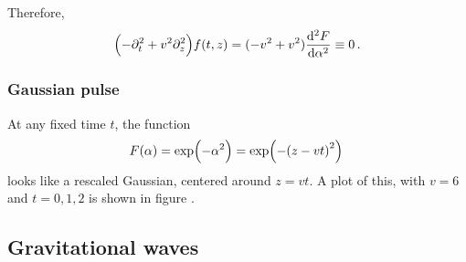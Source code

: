\documentclass[main.tex]{subfiles}
\begin{document}
Therefore, 
%
\begin{align}
\qty(-\partial_{t}^2 + v^2 \partial_{z}^2) f(t, z) 
= (-v^2 + v^2) \dv[2]{F}{\alpha } \equiv 0 
\,.
\end{align}

\subsubsection{Gaussian pulse}

At any fixed time \(t\), the function 
%
\begin{align}
F(\alpha ) = \exp(- \alpha^2) = \exp(- \qty(z - v t)^2)
\,
\end{align}
%
looks like a rescaled Gaussian, centered around \(z = vt\). A plot of this, with \(v = 6\) and \(t = 0, 1, 2\) is shown in figure . 

\subsection{Gravitational waves}
\end{document}
